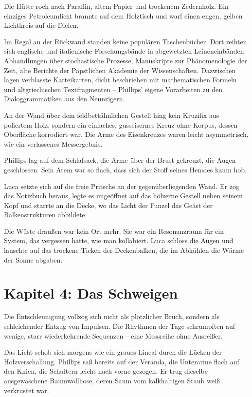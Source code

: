 \documentclass[
  ngerman,
]{article}
\begin{document}
Die Hütte roch nach Paraffin, altem Papier und trockenem Zedernholz. Ein
einziges Petroleumlicht brannte auf dem Holztisch und warf einen engen,
gelben Lichtkreis auf die Dielen.

Im Regal an der Rückwand standen keine populären Taschenbücher. Dort
reihten sich englische und italienische Forschungsbände in abgewetzten
Leineneinbänden: Abhandlungen über stochastische Prozesse, Manuskripte
zur Phänomenologie der Zeit, alte Berichte der Päpstlichen Akademie der
Wissenschaften. Dazwischen lagen verblasste Karteikarten, dicht
beschrieben mit mathematischen Formeln und altgriechischen
Textfragmenten -- Phillips' eigene Vorarbeiten zu den Dialoggrammatiken
aus den Neunzigern.

An der Wand über dem feldbettähnlichen Gestell hing kein Kruzifix aus
poliertem Holz, sondern ein einfaches, gusseisernes Kreuz ohne Korpus,
dessen Oberfläche korrodiert war. Die Arme des Eisenkreuzes waren leicht
asymmetrisch, wie ein verlassenes Messergebnis.

Phillips lag auf dem Schlafsack, die Arme über der Brust gekreuzt, die
Augen geschlossen. Sein Atem war so flach, dass sich der Stoff seines
Hemdes kaum hob.

Luca setzte sich auf die freie Pritsche an der gegenüberliegenden Wand.
Er zog das Notizbuch heraus, legte es ungeöffnet auf das hölzerne
Gestell neben seinem Kopf und starrte an die Decke, wo das Licht der
Funzel das Geäst der Balkenstrukturen abbildete.

Die Wüste draußen war kein Ort mehr. Sie war ein Resonanzraum für ein
System, das vergessen hatte, wie man kollabiert. Luca schloss die Augen
und lauschte auf das trockene Ticken der Deckenbalken, die im Abkühlen
die Wärme der Sonne abgaben.

\section{\texorpdfstring{\textbf{Kapitel 4: Das
Schweigen}}{Kapitel 4: Das Schweigen}}\label{kapitel-4-das-schweigen}

Die Entschleunigung vollzog sich nicht als plötzlicher Bruch, sondern
als schleichender Entzug von Impulsen. Die Rhythmen der Tage schrumpften
auf wenige, starr wiederkehrende Sequenzen -- eine Messreihe ohne
Ausreißer.

Das Licht schob sich morgens wie ein graues Lineal durch die Lücken der
Holzverschallung. Phillips saß bereits auf der Veranda, die Unterarme
flach auf den Knien, die Schultern leicht nach vorne gezogen. Er trug
dieselbe ausgewaschene Baumwollhose, deren Saum vom kalkhaltigen Staub
weiß verkrustet war.
\end{document}
